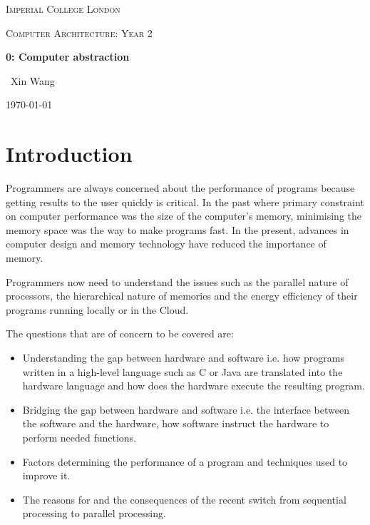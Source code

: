 \documentclass[10pt,a4paper]{article}
\begin{document}

\begin{titlepage}
	\centering
	{\scshape\LARGE Imperial College London \par}
	\vspace{1cm}
    {\scshape\Large Computer Architecture: Year 2\par}
    \vspace{1.5cm}
	{\huge\bfseries 0: Computer abstraction \par}
	\vspace{2cm}
	{\Large\ Xin Wang }
	\vfill
	{\large \today\par}
\end{titlepage}


\tableofcontents
\pagebreak

\section{Introduction}

Programmers are always concerned about the performance of programs because getting results to the
user quickly is critical. In the past where primary constraint on computer performance was the size
of the computer’s memory, minimising the memory space was the way to make programs fast. In the
present, advances in computer design and memory technology have reduced the importance of memory.

Programmers now need to understand the issues such as the parallel nature of processors, the
hierarchical nature of memories and the energy efficiency of their programs running locally or in
the Cloud.

The questions that are of concern to be covered are:
\begin{itemize}
    \item Understanding the gap between hardware and software i.e. how programs written in a
    high-level language such as C or Java are translated into the hardware language and how
    does the hardware execute the resulting program.
    \item Bridging the gap between hardware and software i.e. the interface between the software and
    the hardware, how software instruct the hardware to perform needed functions.
    \item Factors determining the performance of a program and techniques used to improve it.
    \item The reasons for and the consequences of the recent switch from sequential processing to parallel processing.
\end{itemize}
\end{document}
